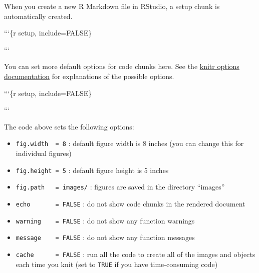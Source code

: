 \documentclass[
  oneside]{book}
\newenvironment{Shaded}{\begin{snugshade}}{\end{snugshade}}
\newcommand{\AttributeTok}[1]{\textcolor[rgb]{0.77,0.63,0.00}{#1}}
\newcommand{\ConstantTok}[1]{\textcolor[rgb]{0.00,0.00,0.00}{#1}}
\newcommand{\DecValTok}[1]{\textcolor[rgb]{0.00,0.00,0.81}{#1}}
\newcommand{\FunctionTok}[1]{\textcolor[rgb]{0.00,0.00,0.00}{#1}}
\newcommand{\NormalTok}[1]{#1}
\newcommand{\SpecialCharTok}[1]{\textcolor[rgb]{0.00,0.00,0.00}{#1}}
\newcommand{\StringTok}[1]{\textcolor[rgb]{0.31,0.60,0.02}{#1}}
\providecommand{\tightlist}{%
  \setlength{\itemsep}{0pt}\setlength{\parskip}{0pt}}
\begin{document}
When you create a new R Markdown file in RStudio, a setup chunk is automatically created.

```\{r setup, include=FALSE\}

\begin{Shaded}
\end{Shaded}

```

You can set more default options for code chunks here. See the \href{https://yihui.name/knitr/options/}{knitr options documentation} for explanations of the possible options.

```\{r setup, include=FALSE\}

\begin{Shaded}
\end{Shaded}

```

The code above sets the following options:

\begin{itemize}
\tightlist
\item
  \texttt{fig.width\ \ =\ 8} : default figure width is 8 inches (you can change this for individual figures)
\item
  \texttt{fig.height\ =\ 5} : default figure height is 5 inches
\item
  \texttt{fig.path\ \ \ =\ \textquotesingle{}images/\textquotesingle{}} : figures are saved in the directory ``images''
\item
  \texttt{echo\ \ \ \ \ \ \ =\ FALSE} : do not show code chunks in the rendered document
\item
  \texttt{warning\ \ \ \ =\ FALSE} : do not show any function warnings
\item
  \texttt{message\ \ \ \ =\ FALSE} : do not show any function messages
\item
  \texttt{cache\ \ \ \ \ \ =\ FALSE} : run all the code to create all of the images and objects each time you knit (set to \texttt{TRUE} if you have time-consuming code)
\end{itemize}
\end{document}

